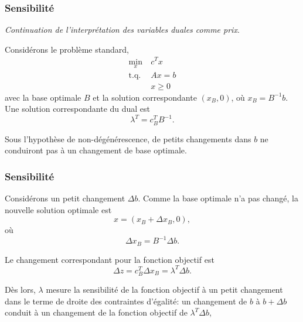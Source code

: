 \documentclass[usepdftitle=false]{beamer}
\begin{document}



\begin{frame}
	\frametitle{Sensibilité}
	
	{\it Continuation de l'interprétation des variables duales comme prix}.
	
	\mbox{}
	
	Considérons le problème standard,
	\begin{align*}
		\min_x \ & c^T x \\
		\mbox{t.q. } & Ax = b \\
		& x \geq 0
	\end{align*}
	avec la base optimale $B$ et la solution correspondante $(x_B, 0)$, où $x_B = B^{-1}b$. Une solution correspondante du dual est
	\[
	\lambda^T = c_B^T B^{-1}.
	\]
	
	\mbox{}
	
	Sous l'hypothèse de non-dégénérescence, de petits changements dans $b$ ne conduiront pas à un changement de base optimale.
	
\end{frame}

\begin{frame}
	\frametitle{Sensibilité}
	
	Considérons un petit changement $\Delta b$. Comme la base optimale n'a pas changé, la nouvelle solution optimale est
	\[
	x = (x_B + \Delta x_B, 0),
	\]
	où
	\[
	\Delta x_B = B^{-1} \Delta b.
	\]
	
	Le changement correspondant pour la fonction objectif est
	\[
	\Delta z = c_B^T \Delta x_B = \lambda^T \Delta b.
	\]
	
	\mbox{}
	
	Dès lors, $\lambda$ mesure la sensibilité de la fonction objectif à un petit changement dans le terme de droite des contraintes d'égalité: un changement de $b$ à $b+\Delta b$ conduit à un changement de la fonction objectif de $\lambda^T \Delta b$,
	
\end{frame}
\end{document}

